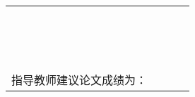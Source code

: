 \begin{table}[h]
\begin{tabular}{|p{0.2\linewidth}p{0.2\linewidth}p{0.2\linewidth}p{0.2\linewidth}|}
		\multicolumn{4}{|l|}{}                                                                                                 \\
		\multicolumn{4}{|l|}{}                                                                                                 \\
		\multicolumn{4}{|l|}{}                                                                                                 \\
		\multicolumn{4}{|l|}{}                                                                                                 \\
		\multicolumn{4}{|l|}{}                                                                                                 \\
		\multicolumn{4}{|l|}{}                                                                                                 \\
		\multicolumn{4}{|l|}{}                                                                                                 \\
		\multicolumn{4}{|l|}{}                                                                                                 \\
		\multicolumn{4}{|l|}{}                                                                                                 \\
		\multicolumn{4}{|l|}{}                                                                                                 \\
		\multicolumn{4}{|l|}{}                                                                                                 \\
		\multicolumn{4}{|l|}{}                                                                                                 \\
		\multicolumn{4}{|l|}{}                                                                                                 \\
		\multicolumn{4}{|l|}{}                                                                                                 \\
		\hline
		\multicolumn{4}{|l|}{}                                                                                                 \\
		\multicolumn{4}{|l|}{指导教师建议论文成绩为：}                                                                         \\

\end{tabular}
\end{table}
